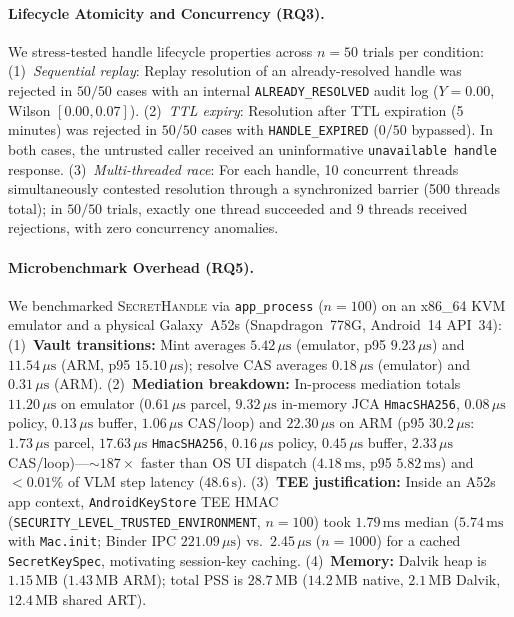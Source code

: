 \documentclass[sigconf,10pt]{acmart}
\newcommand{\SH}{\textsc{SecretHandle}}
\theoremstyle{acmplain}%
\begin{document}
\paragraph{Lifecycle Atomicity and Concurrency (RQ3).}
We stress-tested handle lifecycle properties across $n=50$ trials per condition: (1)~\emph{Sequential replay}: Replay resolution of an already-resolved handle was rejected in $50/50$ cases with an internal \texttt{ALREADY\_RESOLVED} audit log ($Y=0.00$, Wilson $[0.00, 0.07]$). (2)~\emph{TTL expiry}: Resolution after TTL expiration (5 minutes) was rejected in $50/50$ cases with \texttt{HANDLE\_EXPIRED} ($0/50$ bypassed). In both cases, the untrusted caller received an uninformative \texttt{unavailable handle} response. (3)~\emph{Multi-threaded race}: For each handle, 10 concurrent threads simultaneously contested resolution through a synchronized barrier (500 threads total); in $50/50$ trials, exactly one thread succeeded and 9 threads received rejections, with zero concurrency anomalies.

\paragraph{Microbenchmark Overhead (RQ5).}
We benchmarked \SH{} via \texttt{app\_process} ($n=100$) on an x86\_64 KVM emulator and a physical Galaxy~A52s (Snapdragon~778G, Android~14 API~34): (1)~\textbf{Vault transitions:} Mint averages $5.42\,\mu\text{s}$ (emulator, p95 $9.23\,\mu\text{s}$) and $11.54\,\mu\text{s}$ (ARM, p95 $15.10\,\mu\text{s}$); resolve CAS averages $0.18\,\mu\text{s}$ (emulator) and $0.31\,\mu\text{s}$ (ARM). (2)~\textbf{Mediation breakdown:} In-process mediation totals $11.20\,\mu\text{s}$ on emulator ($0.61\,\mu\text{s}$ parcel, $9.32\,\mu\text{s}$ in-memory JCA \texttt{HmacSHA256}, $0.08\,\mu\text{s}$ policy, $0.13\,\mu\text{s}$ buffer, $1.06\,\mu\text{s}$ CAS/loop) and $22.30\,\mu\text{s}$ on ARM (p95 $30.2\,\mu\text{s}$: $1.73\,\mu\text{s}$ parcel, $17.63\,\mu\text{s}$ \texttt{HmacSHA256}, $0.16\,\mu\text{s}$ policy, $0.45\,\mu\text{s}$ buffer, $2.33\,\mu\text{s}$ CAS/loop)---$\sim 187\times$ faster than OS UI dispatch ($4.18\,\text{ms}$, p95 $5.82\,\text{ms}$) and $<0.01\%$ of VLM step latency ($48.6\,\text{s}$). (3)~\textbf{TEE justification:} Inside an A52s app context, \texttt{AndroidKeyStore} TEE HMAC (\texttt{SECURITY\_LEVEL\_TRUSTED\_ENVIRONMENT}, $n=100$) took $1.79\,\text{ms}$ median ($5.74\,\text{ms}$ with \texttt{Mac.init}; Binder IPC $221.09\,\mu\text{s}$) vs.\ $2.45\,\mu\text{s}$ ($n=1000$) for a cached \texttt{SecretKeySpec}, motivating session-key caching. (4)~\textbf{Memory:} Dalvik heap is $1.15\,\text{MB}$ ($1.43\,\text{MB}$ ARM); total PSS is $28.7\,\text{MB}$ ($14.2\,\text{MB}$ native, $2.1\,\text{MB}$ Dalvik, $12.4\,\text{MB}$ shared ART).
\end{document}
